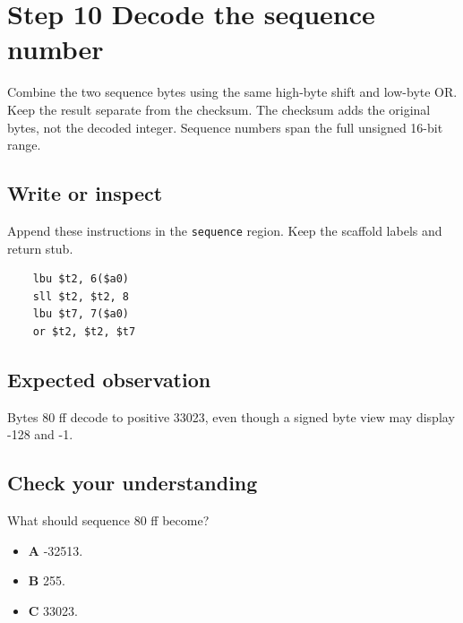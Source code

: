 \section{Step 10 Decode the sequence number}\label{packet-s10}

Combine the two sequence bytes using the same high-byte shift and low-byte OR. Keep the result separate from the checksum. The checksum adds the original bytes, not the decoded integer. Sequence numbers span the full unsigned 16-bit range.

\subsection{Write or inspect}
Append these instructions in the \texttt{sequence} region. Keep the scaffold labels and return stub.

\begin{verbatim}
    lbu $t2, 6($a0)
    sll $t2, $t2, 8
    lbu $t7, 7($a0)
    or $t2, $t2, $t7
\end{verbatim}

\subsection{Expected observation}
Bytes 80 ff decode to positive 33023, even though a signed byte view may display -128 and -1.

\subsection{Check your understanding}
What should sequence 80 ff become?

\begin{itemize}
  \item \textbf{A} -32513.
  \item \textbf{B} 255.
  \item \textbf{C} 33023.
\end{itemize}
